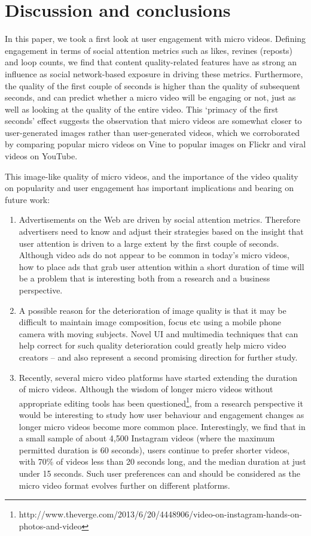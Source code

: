 \section{Discussion and conclusions}
In this paper, we took a first look at user engagement with micro videos. Defining engagement in terms of social attention metrics such as likes, revines (reposts) and loop counts, we find that content quality-related features have as strong an influence as social network-based exposure in driving these metrics. Furthermore, the quality of the first couple of seconds is higher than the quality of subsequent seconds, and can predict whether a micro video will be engaging or not, just as well as looking at the quality of the entire video. This `primacy of the first seconds' effect suggests the observation that  micro videos are somewhat closer to user-generated images rather than user-generated videos, which we corroborated by comparing popular micro videos on Vine  to popular images on Flickr and viral videos on YouTube.

This image-like quality of micro videos, and the importance of the video quality on popularity and user engagement has important implications and bearing on future work: 
\begin{enumerate}
	\item Advertisements on the Web are driven by social attention metrics. Therefore advertisers need to know and adjust their strategies based on the insight that user attention is driven to a large extent by the first couple of seconds. Although  video ads do not appear to be common in today's micro videos, how to place ads that grab user attention within a short duration of time will be a problem that is interesting both from a research and a business perspective. 
	\item A possible reason for the deterioration of image quality is that it may be difficult to maintain image composition, focus etc using a mobile phone camera with moving subjects. Novel UI and multimedia techniques that can help correct for such quality deterioration could greatly help micro video creators -- and also represent a second promising direction for further study. 
	\item Recently, several micro video platforms have started extending the duration of micro videos. Although the wisdom of longer micro videos without appropriate editing tools has been questioned\footnote{\scriptsize http://www.theverge.com/2013/6/20/4448906/video-on-instagram-hands-on-photos-and-video}, from a research perspective it would be interesting to study how user behaviour and engagement changes as longer micro videos become more common place. Interestingly, we find that in a small sample of about 4,500 Instagram videos (where the maximum permitted duration is 60 seconds), users continue to prefer shorter videos, with 70\% of videos less than 20 seconds long, and the median duration at just under 15 seconds. Such user preferences can and should be considered as the micro video format evolves further on different platforms.
	\end{enumerate}

